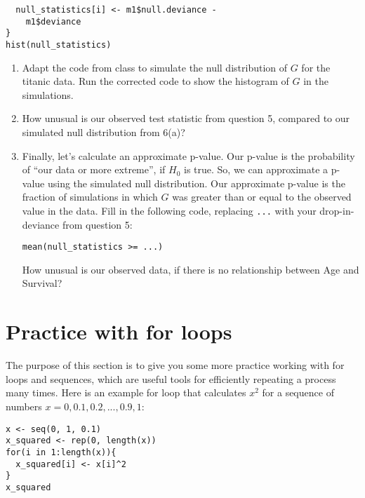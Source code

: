 \documentclass[11pt]{article}
\begin{document}
\begin{enumerate}
\begin{verbatim}
  null_statistics[i] <- m1$null.deviance - 
    m1$deviance
}
hist(null_statistics)
\end{verbatim}

\begin{enumerate}
\item Adapt the code from class to simulate the null distribution of $G$ for the titanic data. Run the corrected code to show the histogram of $G$ in the simulations.

\item How unusual is our observed test statistic from question 5, compared to our simulated null distribution from 6(a)?

\item Finally, let's calculate an approximate p-value. Our p-value is the probability of ``our data or more extreme'', if $H_0$ is true. So, we can approximate a p-value using the simulated null distribution. Our approximate p-value is the fraction of simulations in which $G$ was greater than or equal to the observed value in the data. Fill in the following code, replacing \verb;...; with your drop-in-deviance from question 5:
\begin{verbatim}
mean(null_statistics >= ...)
\end{verbatim}

How unusual is our observed data, if there is no relationship between Age and Survival?
\end{enumerate}

\end{enumerate} 

\vspace{1cm}


\section{Practice with for loops}

The purpose of this section is to give you some more practice working with for loops and sequences, which are useful tools for efficiently repeating a process many times. Here is an example for loop that calculates $x^2$ for a sequence of numbers $x = 0, 0.1, 0.2,...,0.9, 1$:

\begin{verbatim}
x <- seq(0, 1, 0.1)
x_squared <- rep(0, length(x))
for(i in 1:length(x)){
  x_squared[i] <- x[i]^2
}
x_squared
\end{verbatim}
\end{document}

